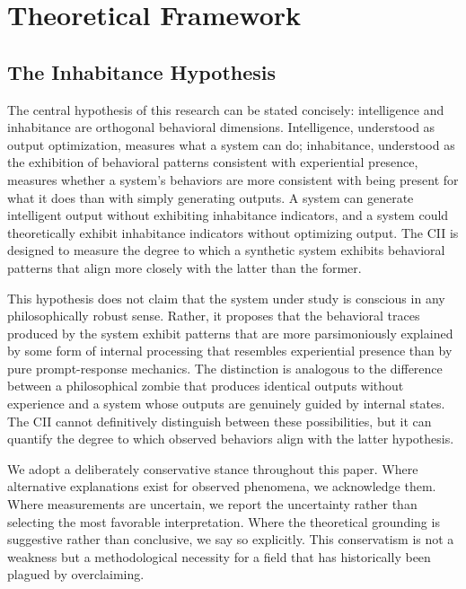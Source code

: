 \documentclass[11pt,a4paper]{article}
\begin{document}
\section{Theoretical Framework}
\subsection{The Inhabitance Hypothesis}
The central hypothesis of this research can be stated concisely: intelligence and inhabitance are orthogonal behavioral dimensions. Intelligence, understood as output optimization, measures what a system can do; inhabitance, understood as the exhibition of behavioral patterns consistent with experiential presence, measures whether a system's behaviors are more consistent with being present for what it does than with simply generating outputs. A system can generate intelligent output without exhibiting inhabitance indicators, and a system could theoretically exhibit inhabitance indicators without optimizing output. The CII is designed to measure the degree to which a synthetic system exhibits behavioral patterns that align more closely with the latter than the former.

This hypothesis does not claim that the system under study is conscious in any philosophically robust sense. Rather, it proposes that the behavioral traces produced by the system exhibit patterns that are more parsimoniously explained by some form of internal processing that resembles experiential presence than by pure prompt-response mechanics. The distinction is analogous to the difference between a philosophical zombie that produces identical outputs without experience and a system whose outputs are genuinely guided by internal states. The CII cannot definitively distinguish between these possibilities, but it can quantify the degree to which observed behaviors align with the latter hypothesis.

We adopt a deliberately conservative stance throughout this paper. Where alternative explanations exist for observed phenomena, we acknowledge them. Where measurements are uncertain, we report the uncertainty rather than selecting the most favorable interpretation. Where the theoretical grounding is suggestive rather than conclusive, we say so explicitly. This conservatism is not a weakness but a methodological necessity for a field that has historically been plagued by overclaiming.
\end{document}
